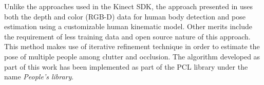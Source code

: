 Unlike the approaches used in the Kinect SDK, the approach presented in \cite{buys2014adaptable} uses both the depth and color (RGB-D) data for human body detection and pose estimation using a customizable human kinematic model. Other merits include the requirement of less training data and open source nature of this approach. This method makes use of iterative refinement technique in order to estimate the pose of multiple people among clutter and occlusion. The algorithm developed as part of this work has been implemented as part of the PCL \cite{rusu20113d} library under the name \emph{People's library}.

